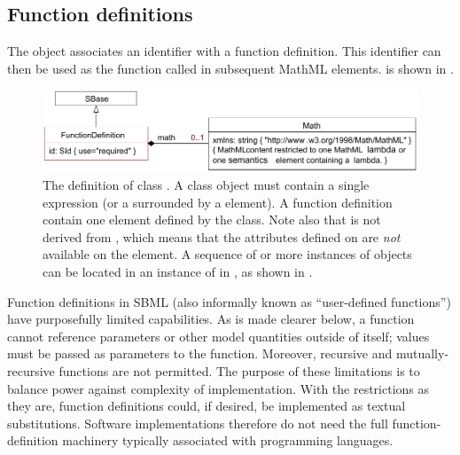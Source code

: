 \subsection{Function definitions}
\label{sec:functiondefinition}

The \FunctionDefinition object associates an identifier with a
function definition.  This identifier can then be used as the
function called in subsequent MathML  elements.
\FunctionDefinition is shown in .

\begin{figure}[htb]
  \centering
  \small
  \vspace*{-0.75ex}
  \includegraphics[scale=0.78]{figs/functiondefinition-uml}
  \vspace*{-1ex}
  \caption{The definition of class \FunctionDefinition.  A
     class object must contain a single \mathml
     expression (or a  surrounded by a
     element).  A function definition 
    contain  one  element defined by the
     class.  Note also that  is not
    derived from \SBaseUpright, which means that the attributes defined
    on \SBaseUpright are \emph{not} available on the 
    element.  A sequence of  or more instances of
    \FunctionDefinition objects can be located in an instance of
    \ListOfFunctionDefinitions in \Model, as shown in
    \protect{}.}
  \label{fig:mathdefinition}
  \label{fig:functionDefinition}
\end{figure}

Function definitions in SBML (also informally known as
``user-defined functions'') have purposefully limited capabilities.
As is made clearer below, a function cannot reference
parameters or other model quantities outside of itself; values
must be passed as parameters to the function.  Moreover, recursive
and mutually-recursive functions are not permitted.  The purpose
of these limitations is to balance power against complexity of
implementation.  With the restrictions as they are, function
definitions could, if desired, be implemented as textual substitutions.
Software implementations therefore do not need
the full function-definition machinery typically associated with
programming languages.



